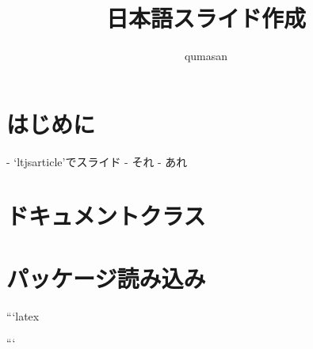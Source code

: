 \documentclass[slide]{ltjsarticle}
\title{日本語スライド作成}
\author{qumasan}
\begin{document}
\layout

\section{はじめに}

\begin{markdown}
- `ltjsarticle'でスライド
- それ
- あれ
\end{markdown}

\section{ドキュメントクラス}


\section{パッケージ読み込み}

\begin{markdown}
```latex
\usepackage{geometry}
\usepackage[hybrid]{markdown}
\usepackage{enumitem}
```
\end{markdown}
\end{document}
